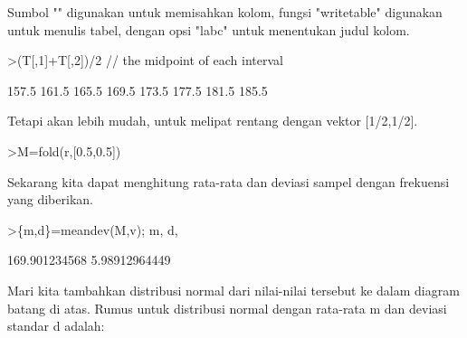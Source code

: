 \documentclass[a4paper,10pt]{article}
\begin{document}
\begin{eulernotebook}
\begin{eulercomment}
Sumbol "\textbar{}" digunakan untuk memisahkan kolom, fungsi "writetable"
digunakan untuk menulis tabel, dengan opsi "labc" untuk menentukan
judul kolom.
\end{eulercomment}
\begin{eulerprompt}
>(T[,1]+T[,2])/2 // the midpoint of each interval
\end{eulerprompt}
\begin{euleroutput}
          157.5 
          161.5 
          165.5 
          169.5 
          173.5 
          177.5 
          181.5 
          185.5 
\end{euleroutput}
\begin{eulercomment}
Tetapi akan lebih mudah, untuk melipat rentang dengan vektor
[1/2,1/2].
\end{eulercomment}
\begin{eulerprompt}
>M=fold(r,[0.5,0.5])
\end{eulerprompt}
\begin{euleroutput}
  [157.5,  161.5,  165.5,  169.5,  173.5,  177.5,  181.5,  185.5]
\end{euleroutput}
\begin{eulercomment}
Sekarang kita dapat menghitung rata-rata dan deviasi sampel dengan
frekuensi yang diberikan.
\end{eulercomment}
\begin{eulerprompt}
>\{m,d\}=meandev(M,v); m, d,
\end{eulerprompt}
\begin{euleroutput}
  169.901234568
  5.98912964449
\end{euleroutput}
\begin{eulercomment}
Mari kita tambahkan distribusi normal dari nilai-nilai tersebut ke
dalam diagram batang di atas. Rumus untuk distribusi normal dengan
rata-rata m dan deviasi standar d adalah:


\end{eulercomment}
\end{eulernotebook}
\end{document}
